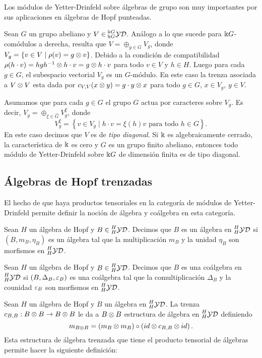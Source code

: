 \documentclass[a4paper,oneside,fleqn,11pt,../tesis.tex]{subfiles}
\newcommand{\yetter}{\prescript{H}{H}{\mathcal{YD}}}
\newcommand{\yetterg}{\prescript{\field G}{\field G}{\mathcal{YD}}}
\begin{document}
Los módulos de Yetter-Drinfeld sobre álgebras de grupo son muy importantes por sus aplicaciones en álgebras de Hopf punteadas.
\begin{example}
	Sean $G$ un grupo abeliano y $V \in \yetterg$. Análogo a lo que sucede para $\Bbbk G$-comódulos a derecha,
	resulta que $V = \oplus_{g \in G} V_g$, donde $V_g = \left\lbrace v \in V \mid \rho(v) = g \otimes v \right\rbrace$. Debido a la condición
	de compatibilidad $\rho(h \cdot v) = hgh^{-1} \otimes h \cdot v = g \otimes h \cdot v$ para todo $v \in V$ y $h \in H$.
	Luego para cada $g \in G$, el subespacio vectorial $V_g$ es un $G$-módulo.
	En este caso la trenza asociada a $V \otimes V$ esta dada por $c_{V, V}(x \otimes y) = g \cdot y \otimes x$ para todo $g \in G$, $x \in V_g$,
	$y \in V$.
	
	Asumamos que para cada $g \in G$ el grupo $G$ actua por caracteres sobre $V_g$. Es decir, $V_g = \oplus_{\xi \in \hat{G}} V_{g}^{\xi}$,
	donde
	\[
		V_{g}^{\xi} = \left\lbrace v \in V_g \mid h \cdot v = \xi(h)v \text{ para todo } h \in G \right\rbrace.	
	\]
	En este caso decimos que $V$ es de \emph{tipo diagonal}.
	Si $\Bbbk$ es algebraicamente cerrado, la característica de $\Bbbk$ es cero
	y $G$ es un grupo finito abeliano, entonces todo módulo de Yetter-Drinfeld sobre $\Bbbk G$ de dimensión finita es de tipo diagonal.
\end{example}

\subsection{Álgebras de Hopf trenzadas}
El hecho de que haya productos tensoriales en la categoría de módulos de Yetter-Drinfeld permite definir la noción de álgebra y coálgebra
en esta categoría.

\begin{definition}
	Sean $H$ un álgebra de Hopf y $B \in \yetter$. Decimos que $B$ es un álgebra en $\yetter$ si $\left(B,m_B,\eta_B\right)$ es un álgebra
	tal que la multiplicación $m_B$ y la unidad $\eta_B$ son morfismos en $\yetter$.
\end{definition}

\begin{definition}
	Sean $H$ un álgebra de Hopf y $B \in \yetter$. Decimos que $B$ es una coálgebra en $\yetter$ si $\left(B,\Delta_B,\varepsilon_B\right)$ es una coálgebra
	tal que la comultiplicación $\Delta_B$ y la counidad $\varepsilon_B$ son morfismos en $\yetter$.
\end{definition}

Sean $H$ un álgebra de Hopf y $B$ un álgebra en $\yetter$.  La trenza $c_{B, B}: B \otimes B \to B \otimes B$ le da a $B \otimes B$ estructura de álgebra en $\yetter$ definiendo
\[
	m_{B \otimes B} = \left(m_B \otimes m_B \right) \circ \left(id \otimes c_{B, B} \otimes id \right).
\]
Esta estructura de álgebra trenzada que tiene el producto tensorial de álgebras permite hacer la siguiente definición:
\end{document}
